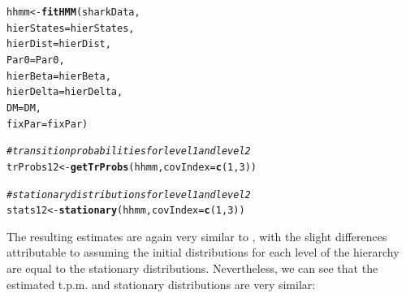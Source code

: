 \documentclass[12pt]{article}\usepackage[]{graphicx}\usepackage[]{xcolor}
\makeatletter
\newcommand{\hlnum}[1]{\textcolor[rgb]{0.686,0.059,0.569}{#1}}%
\newcommand{\hlcom}[1]{\textcolor[rgb]{0.678,0.584,0.686}{\textit{#1}}}%
\newcommand{\hldef}[1]{\textcolor[rgb]{0.345,0.345,0.345}{#1}}%
\newcommand{\hlkwb}[1]{\textcolor[rgb]{0.69,0.353,0.396}{#1}}%
\newcommand{\hlkwc}[1]{\textcolor[rgb]{0.333,0.667,0.333}{#1}}%
\newcommand{\hlkwd}[1]{\textcolor[rgb]{0.737,0.353,0.396}{\textbf{#1}}}%
\newenvironment{kframe}{%
 \def\at@end@of@kframe{}%
 \ifinner\ifhmode%
  \def\at@end@of@kframe{\end{minipage}}%
  \begin{minipage}{\columnwidth}%
 \fi\fi%
 \def\FrameCommand##1{\hskip\@totalleftmargin \hskip-\fboxsep
 \colorbox{shadecolor}{##1}\hskip-\fboxsep
     \hskip-\linewidth \hskip-\@totalleftmargin \hskip\columnwidth}%
 \MakeFramed {\advance\hsize-\width
   \@totalleftmargin\z@ \linewidth\hsize
   \@setminipage}}%
 {\par\unskip\endMakeFramed%
 \at@end@of@kframe}
\newenvironment{knitrout}{}{} %
\makeatother
\begin{document}
\begin{knitrout}
\color{fgcolor}\begin{kframe}
\begin{alltt}
\hldef{hhmm} \hlkwb{<-} \hlkwd{fitHMM}\hldef{(sharkData,}
               \hlkwc{hierStates}\hldef{=hierStates,}
               \hlkwc{hierDist}\hldef{=hierDist,}
               \hlkwc{Par0}\hldef{=Par0,}
               \hlkwc{hierBeta}\hldef{=hierBeta,}
               \hlkwc{hierDelta}\hldef{=hierDelta,}
               \hlkwc{DM}\hldef{=DM,}
               \hlkwc{fixPar}\hldef{=fixPar)}

\hlcom{# transition probabilities for level1 and level2}
\hldef{trProbs12} \hlkwb{<-} \hlkwd{getTrProbs}\hldef{(hhmm,} \hlkwc{covIndex}\hldef{=}\hlkwd{c}\hldef{(}\hlnum{1}\hldef{,}\hlnum{3}\hldef{))}

\hlcom{# stationary distributions for level1 and level2}
\hldef{stats12} \hlkwb{<-} \hlkwd{stationary}\hldef{(hhmm,} \hlkwc{covIndex}\hldef{=}\hlkwd{c}\hldef{(}\hlnum{1}\hldef{,}\hlnum{3}\hldef{))}
\end{alltt}
\end{kframe}
\end{knitrout}
The resulting estimates are again very similar to \cite{AdamEtAl2019}, with the slight differences attributable to \cite{AdamEtAl2019} assuming the initial distributions for each level of the hierarchy are equal to the stationary distributions. Nevertheless, we can see that the estimated t.p.m. and stationary distributions are very similar:
\end{document}
